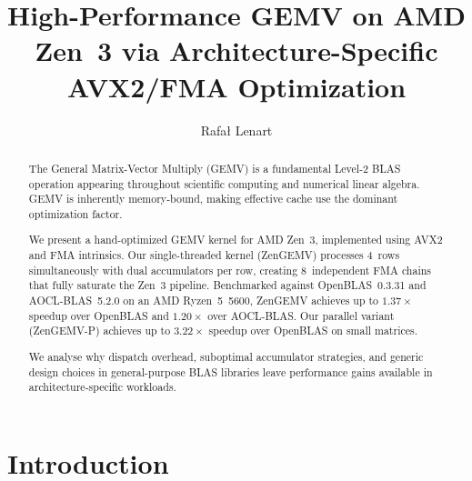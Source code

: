 \documentclass[runningheads]{llncs}
\begin{document}
\title{High-Performance GEMV on AMD Zen~3 via Architecture-Specific AVX2/FMA Optimization}

\author{Rafa{\l} Lenart}

\maketitle

\begin{abstract}
The General Matrix-Vector Multiply (GEMV) is a fundamental Level-2 BLAS operation
appearing throughout scientific computing and numerical linear algebra.
GEMV is inherently memory-bound, making effective cache use the dominant optimization factor.

We present a hand-optimized GEMV kernel for AMD Zen~3, implemented using AVX2 and
FMA intrinsics. Our single-threaded kernel (ZenGEMV) processes 4~rows simultaneously
with dual accumulators per row, creating 8~independent FMA chains that fully saturate
the Zen~3 pipeline. Benchmarked against OpenBLAS~0.3.31 and AOCL-BLAS~5.2.0 on an
AMD Ryzen~5~5600, ZenGEMV achieves up to $1.37\times$ speedup over OpenBLAS and
$1.20\times$ over AOCL-BLAS. Our parallel variant (ZenGEMV-P) achieves up to
$3.22\times$ speedup over OpenBLAS on small matrices.

We analyse why dispatch overhead, suboptimal accumulator strategies, and generic
design choices in general-purpose BLAS libraries leave performance gains available in
architecture-specific workloads.

\end{abstract}


\section{Introduction}
\end{document}
